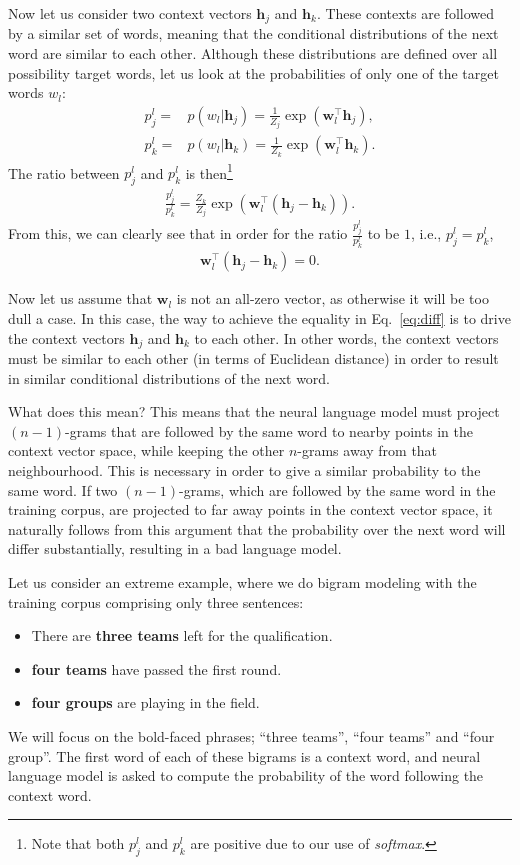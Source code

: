 \documentclass{report}
\newcommand{\vect}[1]{\mathbf{#1}}
\newcommand{\vh}[0]{\vect{h}}
\newcommand{\vw}[0]{\vect{w}}
\begin{document}
Now let us consider two context vectors $\vh_j$ and $\vh_k$. These contexts are
followed by a similar set of words, meaning that the conditional distributions
of the next word are similar to each other. Although these distributions are
defined over all possibility target words, let us look at the probabilities of
only one of the target words $w_l$: 
\begin{align*}
    p_j^l =& p(w_l | \vh_j) = \frac{1}{Z_j} \exp\left( \vw_l^\top \vh_j \right), \\
    p_k^l =& p(w_l | \vh_k) = \frac{1}{Z_k} \exp\left( \vw_l^\top \vh_k \right).
\end{align*}
The ratio between $p_j^l$ and $p_k^l$ is then\footnote{
    Note that both $p_j^l$ and $p_k^l$ are positive due to our use of {\em softmax}.
}
\begin{align*}
    \frac{p_j^l}{p_k^l} = \frac{Z_k}{Z_j} \exp\left( \vw_l^\top (\vh_j -
    \vh_k)\right).
\end{align*}
From this, we can clearly see that in order for the ratio $\tfrac{p_j^l}{p_k^l}$
to be $1$, i.e., $p_j^l = p_k^l$, 
\begin{align}
    \label{eq:diff}
    \vw_l^\top \left(\vh_j - \vh_k\right) = 0.
\end{align}

Now let us assume that $\vw_l$ is not an all-zero vector, as otherwise it will
be too dull a case. In this case, the way to achieve the equality in
Eq.~\eqref{eq:diff} is to drive the context vectors $\vh_j$ and $\vh_k$ to each
other. In other words, the context vectors must be similar to each other (in
terms of Euclidean distance) in order to result in similar conditional
distributions of the next word.

What does this mean? This means that the neural language model must project
$(n-1)$-grams that are followed by the same word to nearby points in the context
vector space, while keeping the other $n$-grams away from that neighbourhood.
This is necessary in order to give a similar probability to the same word. If
two $(n-1)$-grams, which are followed by the same word in the training corpus,
are projected to far away points in the context vector space, it naturally
follows from this argument that the probability over the next word will differ
substantially, resulting in a bad language model.

Let us consider an extreme example, where we do bigram modeling with the
training corpus comprising only three sentences:
\begin{itemize}
    \itemsep 0em
    \item There are {\bf three teams} left for the qualification.
    \item {\bf four teams} have passed the first round.
    \item {\bf four groups} are playing in the field.
\end{itemize}
We will focus on the bold-faced phrases; ``three teams'', ``four teams'' and
``four group''. The first word of each of these bigrams is a context word, and
neural language model is asked to compute the probability of the word following
the context word.
\end{document}
